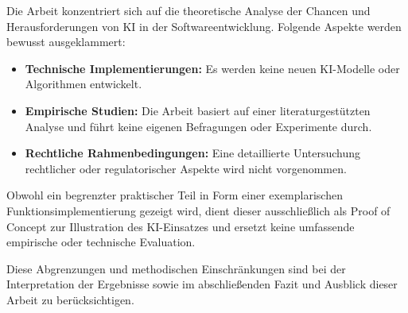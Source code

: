 
Die Arbeit konzentriert sich auf die theoretische Analyse der Chancen und
Herausforderungen von KI in der Softwareentwicklung. Folgende Aspekte werden
bewusst ausgeklammert:

\begin{itemize}
    \item \textbf{Technische Implementierungen:} Es werden keine neuen KI-Modelle oder Algorithmen entwickelt.
    \item \textbf{Empirische Studien:} Die Arbeit basiert auf einer literaturgestützten Analyse und führt keine eigenen Befragungen oder Experimente durch.
    \item \textbf{Rechtliche Rahmenbedingungen:} Eine detaillierte Untersuchung rechtlicher oder regulatorischer Aspekte wird nicht vorgenommen.
\end{itemize}

Obwohl ein begrenzter praktischer Teil in Form einer exemplarischen
Funktionsimplementierung gezeigt wird, dient dieser ausschließlich als Proof of
Concept zur Illustration des KI-Einsatzes und ersetzt keine umfassende
empirische oder technische Evaluation.

Diese Abgrenzungen und methodischen Einschränkungen sind bei der Interpretation
der Ergebnisse sowie im abschließenden Fazit und Ausblick dieser Arbeit zu
berücksichtigen.

